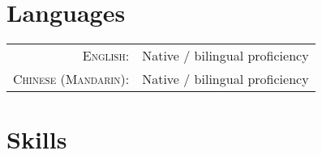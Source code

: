 \documentclass[a4paper,10pt]{article} %
\begin{document}

\section{Languages}

\begin{tabular}{rl}
\textsc{English:} & Native / bilingual proficiency\\
\textsc{Chinese (Mandarin):} & Native / bilingual proficiency\\
\end{tabular}


\section{Skills}
\end{document}

